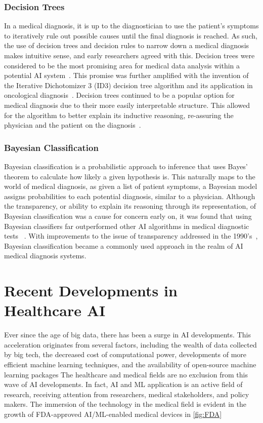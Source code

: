 \documentclass[a4paper]{article}
\begin{document}
\subsubsection{Decision Trees}
In a medical diagnosis, it is up to the diagnostician to use the patient's symptoms to iteratively rule out possible causes until the final diagnosis is reached. As such, the use of decision trees and decision rules to narrow down a medical diagnosis makes intuitive sense, and early researchers agreed with this. Decision trees were considered to be the most promising area for medical data analysis within a potential AI system~\cite{kononenko_machine_2001}. This promise was further amplified with the invention of the Iterative Dichotomizer 3 (ID3) decision tree algorithm and its application in oncological diagnosis~\cite{kononenko_machine_2001}. Decision trees continued to be a popular option for medical diagnosis due to their more easily interpretable structure. This allowed for the algorithm to better explain its inductive reasoning, re-assuring the physician and the patient on the diagnosis~\cite{kononenko_machine_2001}. 

\subsubsection{Bayesian Classification}
Bayesian classification is a probabilistic approach to inference that uses Bayes' theorem to calculate how likely a given hypothesis is. This naturally maps to the world of medical diagnosis, as given a list of patient symptoms, a Bayesian model assigns probabilities to each potential diagnosis, similar to a physician. Although the transparency, or ability to explain its reasoning through its representation, of Bayesian classification was a cause for concern early on, it was found that using Bayesian classifiers far outperformed other AI algorithms in medical diagnostic tests~ \cite{kononenko_machine_2001}. With improvements to the issue of transparency addressed in the 1990's~\cite{kononenko_machine_2001}, Bayesian classification became a commonly used approach in the realm of AI medical diagnosis systems.  

\section{Recent Developments in Healthcare AI}
Ever since the age of big data, there has been a surge in AI developments. 
This acceleration originates from several factors, including the wealth of data collected by big tech, the decreased cost of computational power, developments of more efficient machine learning techniques, and the availability of open-source machine learning packages
The healthcare and medical fields are no exclusion from this wave of AI developments. 
In fact, AI and ML application is an active field of research, receiving attention from researchers, medical stakeholders, and policy makers.
The immersion of the technology in the medical field is evident in the growth of FDA-approved AI/ML-enabled medical devices in \autoref{fig:FDA} \cite{FDA_artificial_nodate}
\end{document}

